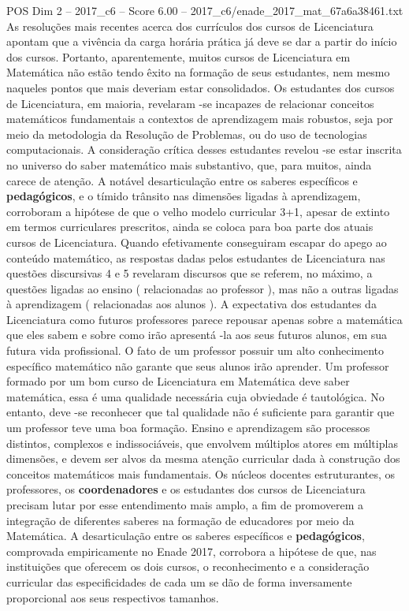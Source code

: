 \begin{textsample}{POS Dim 2 – 2017\_c6 – Score 6.00 – 2017\_c6/enade\_2017\_mat\_67a6a38461.txt}
As resoluções mais recentes acerca dos currículos dos cursos de Licenciatura apontam que a vivência da carga horária prática já deve se dar a partir do início dos cursos.
Portanto, aparentemente, muitos cursos de Licenciatura em Matemática não estão tendo êxito na formação de seus estudantes, nem mesmo naqueles pontos que mais deveriam estar consolidados.
Os estudantes dos cursos de Licenciatura, em maioria, revelaram -se incapazes de relacionar conceitos matemáticos fundamentais a contextos de aprendizagem mais robustos, seja por meio da metodologia da Resolução de Problemas, ou do uso de tecnologias computacionais.
A consideração crítica desses estudantes revelou -se estar inscrita no universo do saber matemático mais substantivo, que, para muitos, ainda carece de atenção.
A notável desarticulação entre os saberes específicos e \textbf{pedagógicos}, e o tímido trânsito nas dimensões ligadas à aprendizagem, corroboram a hipótese de que o velho modelo curricular 3+1, apesar de extinto em termos curriculares prescritos, ainda se coloca para boa parte dos atuais cursos de Licenciatura.
Quando efetivamente conseguiram escapar do apego ao conteúdo matemático, as respostas dadas pelos estudantes de Licenciatura nas questões discursivas 4 e 5 revelaram discursos que se referem, no máximo, a questões ligadas ao ensino ( relacionadas ao professor ), mas não a outras ligadas à aprendizagem ( relacionadas aos alunos ).
A expectativa dos estudantes da Licenciatura como futuros professores parece repousar apenas sobre a matemática que eles sabem e sobre como irão apresentá -la aos seus futuros alunos, em sua futura vida profissional.
O fato de um professor possuir um alto conhecimento específico matemático não garante que seus alunos irão aprender.
Um professor formado por um bom curso de Licenciatura em Matemática deve saber matemática, essa é uma qualidade necessária cuja obviedade é tautológica.
No entanto, deve -se reconhecer que tal qualidade não é suficiente para garantir que um professor teve uma boa formação.
Ensino e aprendizagem são processos distintos, complexos e indissociáveis, que envolvem múltiplos atores em múltiplas dimensões, e devem ser alvos da mesma atenção curricular dada à construção dos conceitos matemáticos mais fundamentais.
Os núcleos docentes estruturantes, os professores, os \textbf{coordenadores} e os estudantes dos cursos de Licenciatura precisam lutar por esse entendimento mais amplo, a fim de promoverem a integração de diferentes saberes na formação de educadores por meio da Matemática.
A desarticulação entre os saberes específicos e \textbf{pedagógicos}, comprovada empiricamente no Enade 2017, corrobora a hipótese de que, nas instituições que oferecem os dois cursos, o reconhecimento e a consideração curricular das especificidades de cada um se dão de forma inversamente proporcional aos seus respectivos tamanhos.

\end{textsample}
